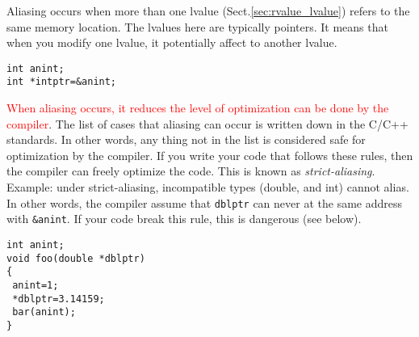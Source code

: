 Aliasing occurs when more than one lvalue (Sect.\ref{sec:rvalue_lvalue}) refers
to the same memory location. The lvalues here are typically pointers. It means
that when you modify one lvalue, it potentially affect to another lvalue.

\begin{Verbatim}
int anint;
int *intptr=&anint;
\end{Verbatim}

\textcolor{red}{When aliasing occurs, it reduces the level of optimization can
be done by the compiler}. The list of cases that aliasing can occur is written
down in the C/C++ standards. In other words, any thing not in the list is
considered safe for optimization by the compiler. If you write your code that
follows these rules, then the compiler can freely optimize the code. This is
known as {\it strict-aliasing}. Example: under strict-aliasing, incompatible
types (double, and int) cannot alias. In other words, the compiler assume that
\verb!dblptr! can never at the same address with  \verb!&anint!. If your code
break this rule, this is dangerous (see below).
\begin{Verbatim}
int anint;
void foo(double *dblptr)
{
 anint=1;
 *dblptr=3.14159;
 bar(anint);
}

\end{Verbatim} 

